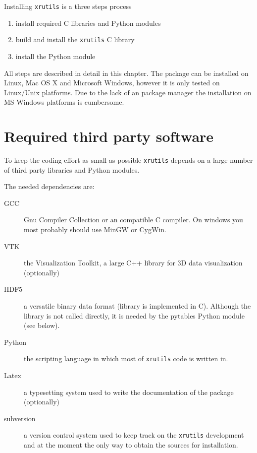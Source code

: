 %
%
%
%


Installing {\tt xrutils} is a three steps process
\begin{enumerate}
\item install required C libraries and Python modules
\item build and install the {\tt xrutils} C library
\item install the Python module
\end{enumerate}
All steps are described in detail in this chapter. The package can be installed on Linux, Mac OS X and Microsoft Windows, however it is only tested on Linux/Unix platforms. Due to the lack of an package manager the installation on MS Windows platforms is cumbersome.

\section{Required third party software}
To keep the coding effort as small as possible {\tt xrutils} depends on a 
large number of third party libraries and Python modules. 

The needed dependencies are: 
\begin{description}
\item[GCC] Gnu Compiler Collection or an compatible C compiler. On windows you most probably should use MinGW or CygWin.
\item[VTK] the Visualization Toolkit, a large C++ library for 3D data
visualization (optionally)
\item[HDF5] a versatile binary data format (library is implemented in C).
Although the library is not called directly, it is needed by the pytables Python
module (see below).
\item[Python] the scripting language in which most of {\tt xrutils} code is written in.
\item[Latex] a typesetting system used to write the documentation of the package (optionally)
\item[subversion] a version control system used to keep track on the {\tt xrutils} development and at the moment the only way to obtain the sources for installation.
\end{description}

